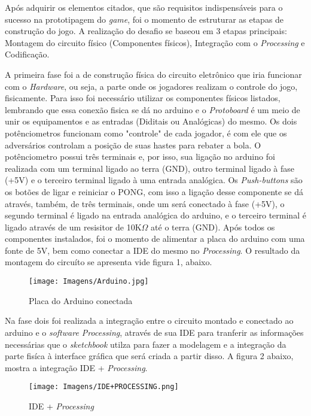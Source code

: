 \documentclass[11pt, a4paper, twocolumn]{article}
\begin{document}
    Após adquirir os elementos citados, que são requisitos indispensáveis para o sucesso na prototipagem do \textit{game}, foi o 
    momento de estruturar as etapas de construção do jogo. A realização do desafio se baseou em 3 etapas principais: Montagem do 
    circuito físico (Componentes físicos), Integração com o \textit{Processing} e Codificação.

    A primeira fase foi a de construção física do circuito eletrônico que iria funcionar com o \textit{Hardware}, ou seja,
    a parte onde os jogadores realizam o controle do jogo, fisicamente. Para isso foi necessário utilizar os componentes físicos listados, lembrando que
    essa conexão fisica se dá no arduino e o \textit{Protoboard} é um meio de unir os equipamentos e as entradas (Diditais ou Analógicas) do mesmo.
    Os dois potênciometros funcionam como "controle" de cada jogador, é com ele que os adversários controlam a posição de suas hastes para 
    rebater a bola. O potênciometro possui três terminais e, por isso, sua ligação no arduino foi realizada com um terminal ligado
    ao terra (GND), outro terminal ligado à fase (+5V) e o terceiro terminal ligado à uma entrada analógica. Os \textit{Push-buttons}
    são os botões de ligar e reiniciar o PONG, com isso a ligação desse componente se dá através, também, de três terminais, onde um será conectado à fase 
    (+5V), o segundo terminal é ligado na entrada analógica do arduino, e o terceiro terminal é ligado através de um resisitor de 10K$\Omega$ até o terra (GND).
    Após todos os componentes instalados, foi o momento de alimentar a placa do arduino com uma fonte de 5V, bem como conectar a IDE do mesmo no \textit{Processing}.
    O resultado da montagem do circuíto se apresenta vide figura 1, abaixo.

        \begin{figure}[h]
            \caption{Placa do Arduino conectada}
            \centering
            \texttt{[image: Imagens/Arduino.jpg]}
        \end{figure}
    
    Na fase dois foi realizada a integração entre o circuito montado e conectado ao arduino e o \textit{software Processing}, através de sua IDE para tranferir as 
    informações necessárias que o \textit{sketchbook} utilza para fazer a modelagem e a integração da parte fisíca à interface gráfica que será criada a partir disso.
    A figura 2 abaixo, mostra a integração IDE + \textit{Processing}.
       
       \begin{figure}[h]
            \caption{IDE + \textit{Processing}}
            \centering
            \texttt{[image: Imagens/IDE+PROCESSING.png]}
        \end{figure}
\end{document}
